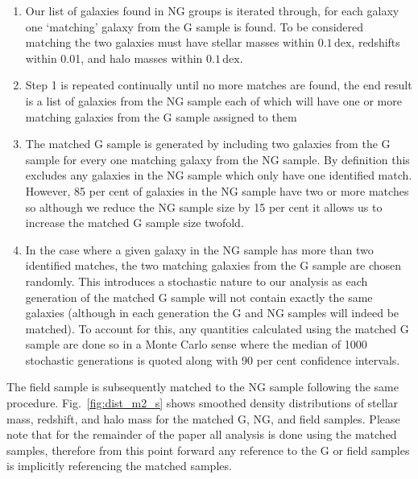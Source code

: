 \documentclass[a4paper,fleqn,usenatbib]{mnras}
\begin{document}
\begin{enumerate}
  \item Our list of galaxies found in NG groups is iterated through,
    for each galaxy one `matching' galaxy from the G sample is
    found.  To be considered matching the two galaxies must have
    stellar masses within $0.1\,\mathrm{dex}$, redshifts within 0.01,
    and halo masses within $0.1\,\mathrm{dex}$.

  \item Step 1 is repeated continually until no more matches are
    found, the end result is a list of galaxies from the NG
    sample each of which will have one or more matching galaxies from
    the G sample assigned to them
  
  \item The matched G sample is generated by including two galaxies
    from the G sample for every one matching galaxy from the NG
    sample.  By definition this excludes any galaxies in the NG
    sample which only have one identified match.  However, 85 per cent
    of galaxies
    in the NG sample have two or more matches so although we reduce
    the NG sample size by 15 per cent it allows us to increase the
    matched G sample size twofold.

  \item In the case where a given galaxy in the NG sample has more
    than two identified matches, the two matching galaxies from the G sample are
    chosen randomly.  This introduces a stochastic nature to our
    analysis as each generation of the matched G sample will not
    contain exactly the same galaxies (although in each generation the
    G and NG samples will indeed be matched).  To account for this, any
    quantities calculated using the matched G sample are done so in a
    Monte Carlo sense where the median of 1000 stochastic generations
    is quoted along with 90 per cent confidence intervals.
\end{enumerate}

\noindent
The field sample is subsequently matched to the NG sample following
the same procedure.  Fig.~\ref{fig:dist_m2_s} shows smoothed density
distributions of stellar mass, redshift, and halo mass for the matched
G, NG, and field samples.  Please note that for the remainder of the
paper all analysis is done using the matched samples, therefore from
this point forward any reference to the G or field samples is
implicitly referencing the matched samples.
\end{document}
